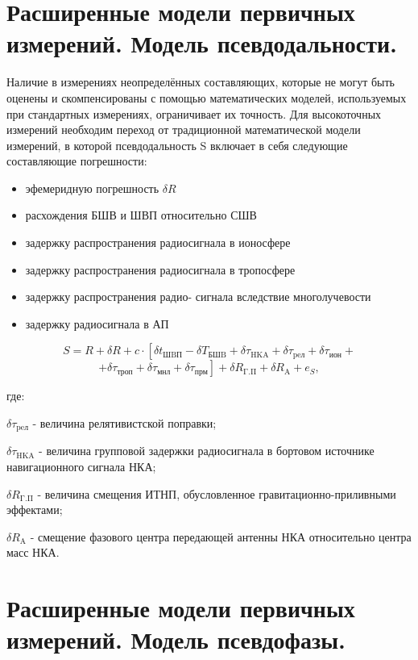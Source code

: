 \documentclass[14pt,a4paper,oneside]{extarticle}
\begin{document}
\section{Расширенные модели первичных измерений. Модель псевдодальности.}

Наличие в измерениях неопределённых составляющих, которые не могут быть оценены и скомпенсированы с помощью математических моделей, используемых при стандартных измерениях, ограничивает их точность. Для высокоточных измерений необходим переход от традиционной математической модели измерений, в которой псевдодальность S включает в себя следующие составляющие погрешности:

\begin{itemize}
    \item эфемеридную погрешность ${\delta}{R}$
    \item расхождения БШВ и ШВП относительно СШВ
    \item задержку распространения радиосигнала в ионосфере
    \item задержку распространения радиосигнала в тропосфере
    \item задержку распространения радио- сигнала вследствие многолучевости
    \item задержку радиосигнала в АП
\end{itemize}

\[S=R+\delta R+c\cdot\left[\delta t_{\text{ШBП}}-\delta T_{\text{БШB}}+\delta\tau_{\text{HKA}}+\delta\tau_{\text{peл}}+\delta\tau_{\text{ион}}\right.+\]
        \[\left.+\delta\tau_{\text{троп}}+\delta\tau_{\text{мнл}}+\delta\tau_{\text{прм}}\right]+\delta R_{\mathrm{\Gamma.\Pi}}+\delta R_{\mathrm{A}}+e_{S},\]

где:

$\delta\tau_{\text{peл}}$ - величина релятивистской поправки;

$\delta\tau_{\text{HKA}}$ - величина групповой задержки радиосигнала в бортовом источнике навигационного сигнала НКА;

$\delta R_{\mathrm{\Gamma.\Pi}}$ - величина смещения ИТНП, обусловленное гравитационно-приливными эффектами;

$\delta R_{\mathrm{A}}$ - смещение фазового центра передающей антенны НКА относительно центра масс НКА.



\section{Расширенные модели первичных измерений. Модель псевдофазы.}
\end{document}
